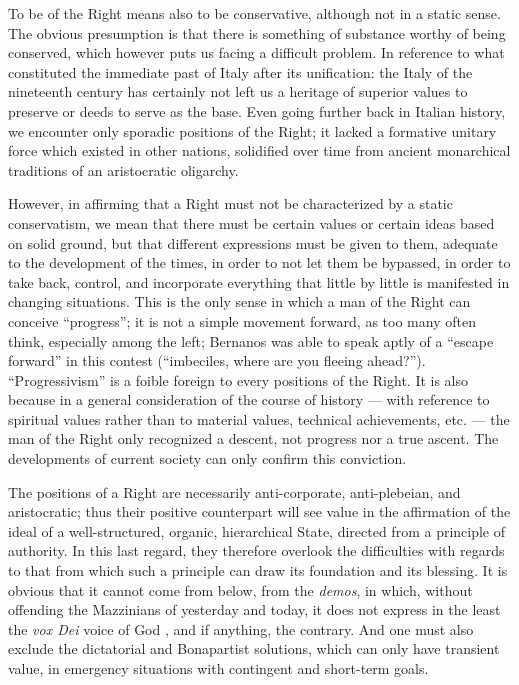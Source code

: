 To be of the Right means also to be conservative, although not in a static sense. The obvious presumption is that there is something of substance worthy of being conserved, which however puts us facing a difficult problem. In reference to what constituted the immediate past of Italy after its unification: the Italy of the nineteenth century has certainly not left us a heritage of superior values to preserve or deeds to serve as the base. Even going further back in Italian history, we encounter only sporadic positions of the Right; it lacked a formative unitary force which existed in other nations, solidified over time from ancient monarchical traditions of an aristocratic oligarchy.

However, in affirming that a Right must not be characterized by a static conservatism, we mean that there must be certain values or certain ideas based on solid ground, but that different expressions must be given to them, adequate to the development of the times, in order to not let them be bypassed, in order to take back, control, and incorporate everything that little by little is manifested in changing situations. This is the only sense in which a man of the Right can conceive ``progress''; it is not a simple movement forward, as too many often think, especially among the left; Bernanos was able to speak aptly of a ``escape forward'' in this contest (``imbeciles, where are you fleeing ahead?''). ``Progressivism'' is a foible foreign to every positions of the Right. It is also because in a general consideration of the course of history --- with reference to spiritual values rather than to material values, technical achievements, etc. --- the man of the Right only recognized a descent, not progress nor a true ascent. The developments of current society can only confirm this conviction.

The positions of a Right are necessarily anti-corporate, anti-plebeian, and aristocratic; thus their positive counterpart will see value in the affirmation of the ideal of a well-structured, organic, hierarchical State, directed from a principle of authority. In this last regard, they therefore overlook the difficulties with regards to that from which such a principle can draw its foundation and its blessing. It is obvious that it cannot come from below, from the \emph{demos}, in which, without offending the Mazzinians of yesterday and today, it does not express in the least the \emph{vox Dei} voice of God , and if anything, the contrary. And one must also exclude the dictatorial and Bonapartist solutions, which can only have transient value, in emergency situations with contingent and short-term goals.

